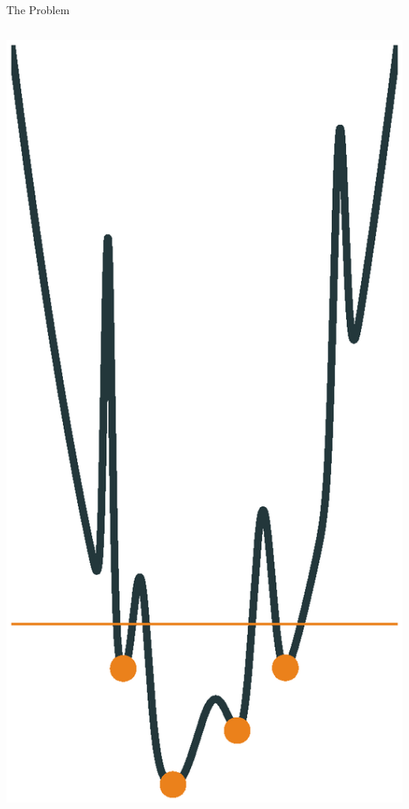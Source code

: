 \documentclass[10pt]{beamer}
\begin{document}
{\begin{frame}[fragile]{The Problem}
\begin{columns}{}
\begin{column}{0.45\textwidth}
\begin{overprint}
				\includegraphics[width=0.9\linewidth]{images/cutoff.eps}
			\end{overprint}
           \end{column}
       \end{columns}     
\end{frame}
}
\end{document}
